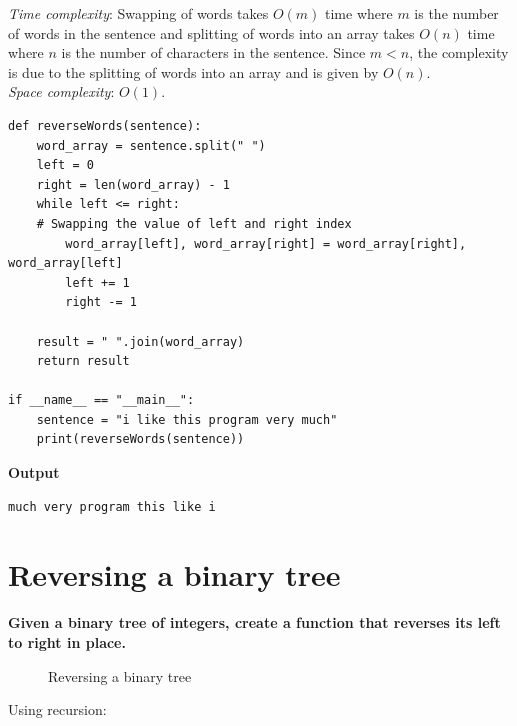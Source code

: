 \documentclass[a4paper,11pt]{book}
\begin{document}
\noindent \textit{Time complexity}: Swapping of words takes $O(m)$ time where $m$ is the number of words in the sentence and splitting of words into an array takes $O(n)$ time where $n$ is the number of characters in the sentence. Since $m<n$, the complexity is due to the splitting of words into an array and is given by $O(n)$.\\
\noindent \textit{Space complexity}: $O(1)$.
\begin{lstlisting}
def reverseWords(sentence):
    word_array = sentence.split(" ")
    left = 0
    right = len(word_array) - 1
    while left <= right:
    # Swapping the value of left and right index
        word_array[left], word_array[right] = word_array[right], word_array[left]
        left += 1
        right -= 1

    result = " ".join(word_array)
    return result

if __name__ == "__main__":
    sentence = "i like this program very much"
    print(reverseWords(sentence))
\end{lstlisting}
\textbf{Output}
\begin{lstlisting}
much very program this like i
\end{lstlisting}

\newpage
\section{Reversing a binary tree}

\textbf{Given a binary tree of integers, create a function that reverses its left to right in place.}
\vspace{5mm}
\begin{figure}[ht]
\begin{center}
\vspace{7mm}
\end{center}
\caption{Reversing a binary tree}
\end{figure}
\noindent Using recursion:
\end{document}
